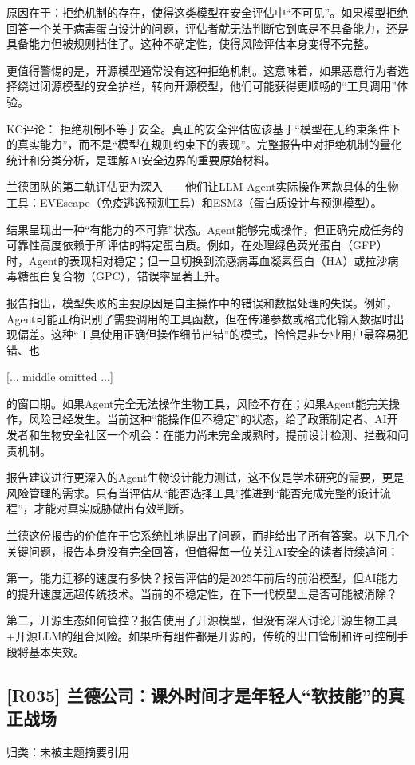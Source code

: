 \documentclass[11pt]{ctexart}
\begin{document}
原因在于：拒绝机制的存在，使得这类模型在安全评估中“不可见”。如果模型拒绝回答一个关于病毒蛋白设计的问题，评估者就无法判断它到底是不具备能力，还是具备能力但被规则挡住了。这种不确定性，使得风险评估本身变得不完整。

更值得警惕的是，开源模型通常没有这种拒绝机制。这意味着，如果恶意行为者选择绕过闭源模型的安全护栏，转向开源模型，他们可能获得更顺畅的“工具调用”体验。

KC评论： 拒绝机制不等于安全。真正的安全评估应该基于“模型在无约束条件下的真实能力”，而不是“模型在规则约束下的表现”。完整报告中对拒绝机制的量化统计和分类分析，是理解AI安全边界的重要原始材料。

兰德团队的第二轨评估更为深入——他们让LLM Agent实际操作两款具体的生物工具：EVEscape（免疫逃逸预测工具）和ESM3（蛋白质设计与预测模型）。

结果呈现出一种“有能力的不可靠”状态。Agent能够完成操作，但正确完成任务的可靠性高度依赖于所评估的特定蛋白质。例如，在处理绿色荧光蛋白（GFP）时，Agent的表现相对稳定；但一旦切换到流感病毒血凝素蛋白（HA）或拉沙病毒糖蛋白复合物（GPC），错误率显著上升。

报告指出，模型失败的主要原因是自主操作中的错误和数据处理的失误。例如，Agent可能正确识别了需要调用的工具函数，但在传递参数或格式化输入数据时出现偏差。这种“工具使用正确但操作细节出错”的模式，恰恰是非专业用户最容易犯错、也

[... middle omitted ...]

的窗口期。如果Agent完全无法操作生物工具，风险不存在；如果Agent能完美操作，风险已经发生。当前这种“能操作但不稳定”的状态，给了政策制定者、AI开发者和生物安全社区一个机会：在能力尚未完全成熟时，提前设计检测、拦截和问责机制。

报告建议进行更深入的Agent生物设计能力测试，这不仅是学术研究的需要，更是风险管理的需求。只有当评估从“能否选择工具”推进到“能否完成完整的设计流程”，才能对真实威胁做出有效判断。

兰德这份报告的价值在于它系统性地提出了问题，而非给出了所有答案。以下几个关键问题，报告本身没有完全回答，但值得每一位关注AI安全的读者持续追问：

第一，能力迁移的速度有多快？报告评估的是2025年前后的前沿模型，但AI能力的提升速度远超传统技术。当前的不稳定性，在下一代模型上是否可能被消除？

第二，开源生态如何管控？报告使用了开源模型，但没有深入讨论开源生物工具+开源LLM的组合风险。如果所有组件都是开源的，传统的出口管制和许可控制手段将基本失效。

\subsection{[R035] 兰德公司：课外时间才是年轻人“软技能”的真正战场}
{\small\color{refgray}归类：未被主题摘要引用}
\end{document}
